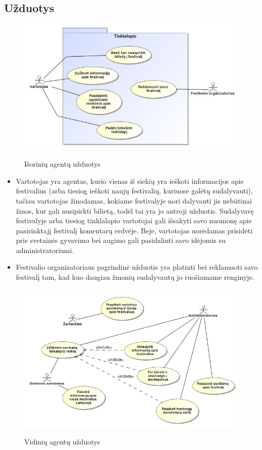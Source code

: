 \documentclass{VUMIFPSkursinis}
\begin{document}
\subsection {Užduotys}

\begin{figure}[H]
    \centering
    \includegraphics[scale=0.5]{img/geri/UzduotysIS}
    \label{img:uml2}
	\caption{Išorinių agentų užduotys}
\end{figure}

\begin{itemize}
\item Vartotojas yra agentas, kurio vienas iš siekių yra ieškoti informacijos apie festivalius (arba tiesiog ieškoti naujų festivalių, kuriuose galėtų sudalyvauti), tačiau vartotojas žinodamas, kokiame festivalyje nori dalyvauti jis nebūtinai žinos, kur gali nusipirkti bilietą, todėl tai yra jo antroji užduotis. Sudalyvavę festivalyje arba tiesiog tinklalapio vartotojai gali išsakyti savo nuomonę apie pasirinktajį festivalį komentarų erdvėje. Beje, vartotojas norėdamas prisidėti prie svetainės gyvavimo bei augimo gali pasidalinti savo idėjomis su administratoriumi.
\item Festivalio organizatoriaus pagrindinė užduotis yra platinti bei reklamuoti savo festivalį tam, kad kuo daugiau žmonių sudalyvautų jo ruošiamame renginyje.
\end{itemize}

\begin{figure}[H]
    \centering
    \includegraphics[scale=0.6]{img/geri/UzduotysVID}
    \label{img:uml3}
	\caption{Vidinių agentų užduotys}
\end{figure}
\end{document}
